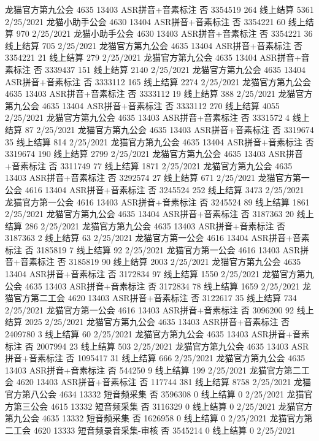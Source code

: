 龙猫官方第九公会	4635	13403	ASR拼音+音素标注	否	3354519	264	线上结算	5361	2/25/2021
龙猫小助手公会	4630	13404	ASR拼音+音素标注	否	3354221	60	线上结算	970	2/25/2021
龙猫小助手公会	4630	13403	ASR拼音+音素标注	否	3354221	36	线上结算	705	2/25/2021
龙猫官方第九公会	4635	13404	ASR拼音+音素标注	否	3354221	21	线上结算	279	2/25/2021
龙猫官方第九公会	4635	13404	ASR拼音+音素标注	否	3339437	151	线上结算	2140	2/25/2021
龙猫官方第九公会	4635	13404	ASR拼音+音素标注	否	3333112	165	线上结算	2274	2/25/2021
龙猫官方第九公会	4635	13403	ASR拼音+音素标注	否	3333112	19	线上结算	388	2/25/2021
龙猫官方第九公会	4635	13404	ASR拼音+音素标注	否	3333112	270	线上结算	4055	2/25/2021
龙猫官方第九公会	4635	13403	ASR拼音+音素标注	否	3331572	4	线上结算	87	2/25/2021
龙猫官方第九公会	4635	13403	ASR拼音+音素标注	否	3319674	35	线上结算	814	2/25/2021
龙猫官方第九公会	4635	13404	ASR拼音+音素标注	否	3319674	190	线上结算	2799	2/25/2021
龙猫官方第九公会	4635	13403	ASR拼音+音素标注	否	3311749	77	线上结算	1871	2/25/2021
龙猫官方第九公会	4635	13403	ASR拼音+音素标注	否	3292574	27	线上结算	671	2/25/2021
龙猫官方第一公会	4616	13404	ASR拼音+音素标注	否	3245524	252	线上结算	3473	2/25/2021
龙猫官方第一公会	4616	13403	ASR拼音+音素标注	否	3245524	89	线上结算	1861	2/25/2021
龙猫官方第九公会	4635	13404	ASR拼音+音素标注	否	3187363	20	线上结算	286	2/25/2021
龙猫官方第九公会	4635	13403	ASR拼音+音素标注	否	3187363	2	线上结算	63	2/25/2021
龙猫官方第一公会	4616	13404	ASR拼音+音素标注	否	3185819	7	线上结算	92	2/25/2021
龙猫官方第一公会	4616	13403	ASR拼音+音素标注	否	3185819	90	线上结算	2003	2/25/2021
龙猫官方第九公会	4635	13404	ASR拼音+音素标注	否	3172834	97	线上结算	1550	2/25/2021
龙猫官方第九公会	4635	13403	ASR拼音+音素标注	否	3172834	78	线上结算	1659	2/25/2021
龙猫官方第二工会	4620	13403	ASR拼音+音素标注	否	3122617	35	线上结算	734	2/25/2021
龙猫官方第一公会	4616	13403	ASR拼音+音素标注	否	3096200	92	线上结算	2025	2/25/2021
龙猫官方第九公会	4635	13403	ASR拼音+音素标注	否	2409780	3	线上结算	60	2/25/2021
龙猫官方第九公会	4635	13403	ASR拼音+音素标注	否	2007994	23	线上结算	503	2/25/2021
龙猫官方第九公会	4635	13403	ASR拼音+音素标注	否	1095417	31	线上结算	666	2/25/2021
龙猫官方第九公会	4635	13403	ASR拼音+音素标注	否	544250	9	线上结算	199	2/25/2021
龙猫官方第二工会	4620	13403	ASR拼音+音素标注	否	117744	381	线上结算	8758	2/25/2021
龙猫官方第八公会	4634	13332	短音频采集	否	3596308	0	线上结算	0	2/25/2021
龙猫官方第三公会	4615	13332	短音频采集	否	3116329	0	线上结算	0	2/25/2021
龙猫官方第九公会	4635	13332	短音频采集	否	1626958	0	线上结算	0	2/25/2021
龙猫官方第二工会	4620	13333	短音频录音采集-审核	否	3545214	0	线上结算	0	2/25/2021

